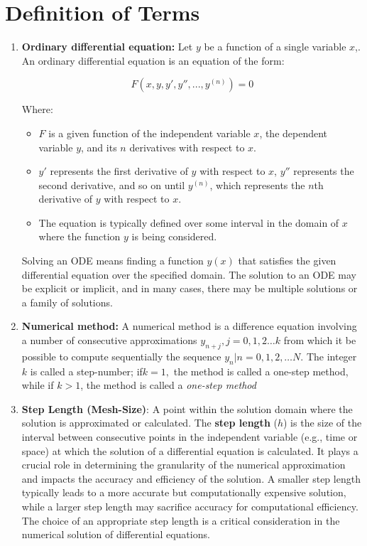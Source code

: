 \documentclass[a4paper, twoside]{report} %
\begin{document}
	\section{Definition of Terms}
	\begin{enumerate}
		\item \textbf{Ordinary differential equation:} Let $y$ be a function of a single variable $x$,. An ordinary differential equation is an equation of the form:


		\begin{equation}
			F(x, y, y', y'', ..., y^{(n)}) = 0
		\end{equation}

		Where:
		\begin{itemize}
			\item $F$ is a given function of the independent variable $x$, the dependent variable $y$, and its $n$ derivatives with respect to $x$.
			\item $y'$ represents the first derivative of $y$ with respect to $x$, $y''$ represents the second derivative, and so on until $y^{(n)}$, which represents the $n$th derivative of $y$ with respect to $x$.
			\item The equation is typically defined over some interval in the domain of $x$ where the function $y$ is being considered.
		\end{itemize}

		Solving an ODE means finding a function $y(x)$ that satisfies the given differential equation over the specified domain. The solution to an ODE may be explicit or implicit, and in many cases, there may be multiple solutions or a family of solutions.

		\item \textbf{Numerical method:} A numerical method is a difference equation involving a number of consecutive approximations $y_{n+j}, j = 0,1,2 \dots k$ from which it be possible to compute sequentially the sequence ${y_{n}|n = 0,1,2, \dots N}$. The integer $k$ is called a step-number; if$k=1,$ the method is called a one-step method, while if $k>1$, the method is called a \textit{one-step method}

		\item \textbf{Step Length (Mesh-Size)}: A point within the solution domain where the solution is approximated or calculated. The \textbf{step length} (\(h\)) is the size of the interval between consecutive points in the independent variable (e.g., time or space) at which the solution of a differential equation is calculated. It plays a crucial role in determining the granularity of the numerical approximation and impacts the accuracy and efficiency of the solution. A smaller step length typically leads to a more accurate but computationally expensive solution, while a larger step length may sacrifice accuracy for computational efficiency. The choice of an appropriate step length is a critical consideration in the numerical solution of differential equations.


\end{enumerate}
\end{document}
